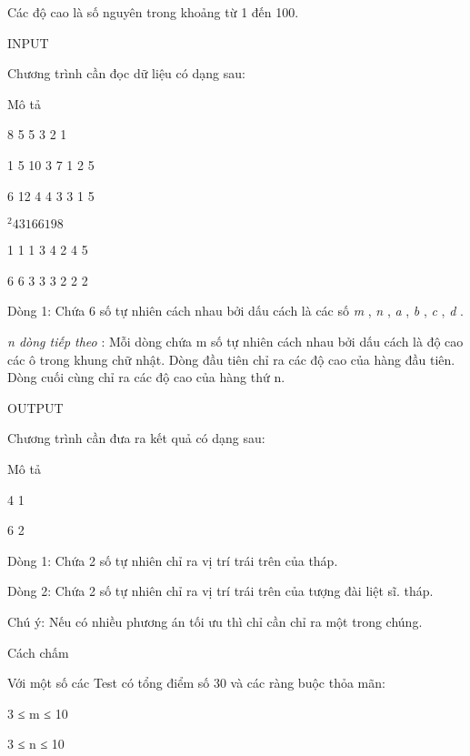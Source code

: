    Các độ cao là số nguyên trong khoảng từ 1 đến 100.        

       INPUT           

   Chương trình cần đọc dữ liệu có dạng sau:        






       Mô tả                    

        8 5 5 3 2 1                       

        1 5 10 3 7 1 2    5                       

        6 12 4 4 3 3 1    5                       

$^         2 4 3 1 6 6 19 8        $

        1 1 1 3 4 2 4    5                       

        6 6 3 3 3 2 2    2       

               Dòng    1:                      Chứa 6              số    tự nhiên cách nhau bởi dấu cách là các số       \textit{         m        }       ,       \textit{        n       }       ,       \textit{        a       }       ,       \textit{        b       }       ,       \textit{         c        }       ,       \textit{        d       }       .                    

\textit{         n dòng tiếp theo        }        :                      Mỗi dòng chứa              m số tự nhiên cách nhau bởi    dấu cách là độ cao các ô trong khung chữ nhật.    Dòng đầu tiên chỉ ra các độ cao của hàng    đầu tiên. Dòng cuối cùng chỉ ra các độ cao    của hàng thứ n.                    



       OUTPUT           

   Chương trình cần đưa ra kết quả có dạng sau:        






         Mô tả        

        4 1                       

        6 2       

         Dòng 1:                Chứa               2                 số tự    nhiên chỉ ra vị trí trái trên của tháp.        

         Dòng 2:                Chứa               2                 số tự    nhiên chỉ ra vị trí trái trên của tượng đài    liệt sĩ. tháp.        



       Chú ý:      Nếu có nhiều phương án tối ưu thì chỉ cần chỉ ra một trong chúng.        

       Cách chấm           

   Với một số các Test có tổng điểm số 30 và các ràng buộc thỏa mãn:        

   3 ≤ m ≤ 10         


   3 ≤ n ≤ 10  

